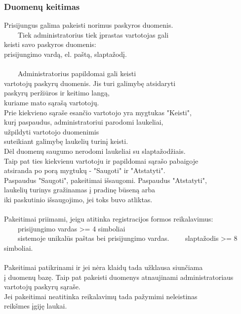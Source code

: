 \documentclass[a4paper,12pt]{article}
\newcommand{\tabitem}{~~\llap{\textbullet}~~}
\begin{document}
\subsubsection{Duomenų keitimas}
Prisijungus galima pakeisti norimus paskyros duomenis.\\
\tabitem Tiek administratorius tiek įprastas vartotojas gali\\
keisti savo paskyros duomenis: \\
prisijungimo vardą, el. paštą, slaptažodį. \\\\
	
\tabitem Administratorius papildomai gali keisti \\
vartotojų paskyrų duomenis. Jis turi galimybę atsidaryti \\
paskyrų peržiūros ir keitimo langą,\\
kuriame mato sąrašą vartotojų.\\
Prie kiekvieno sąraše esančio vartotojo yra mygtukas "Keisti", \\
kurį paspaudus, administratoriui parodomi laukeliai, \\
užpildyti vartotojo duomenimis \\
suteikiant galimybę laukelių turinį keisti.\\
Dėl duomenų saugumo nerodomi laukeliai su slaptažodžiais.\\
Taip pat ties kiekvienu vartotoju ir papildomai sąrašo pabaigoje \\
atsiranda po porą mygtukų - "Saugoti" ir "Atstatyti". \\
Paspaudus "Saugoti", pakeitimai išsaugomi. Paspaudus "Atstatyti", \\
laukelių turinys gražinamas į pradinę būseną arba \\
iki paskutinio išsaugojimo, jei toks buvo atliktas.\\\\

Pakeitimai priimami, jeigu atitinka registracijos formos reikalavimus: \\
	\tabitem prisijungimo vardas >= 4 simboliai\\
	\tabitem sistemoje unikalūs paštas bei prisijungimo vardas.
    \tabitem slaptažodis >= 8 simboliai. \\\\
    
Pakeitimai patikrinami ir jei nėra klaidų tada užklausa siunčiama \\
į duomenų bazę. Taip pat pakeisti duomenys atnaujinami administratoriaus \\
vartotojų paskyrų sąraše. \\
Jei pakeitimai neatitinka reikalavimų tada pažymimi neleistinas \\
reikšmes įgiję laukai.\\
\end{document}
